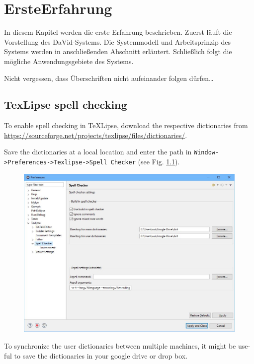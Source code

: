 \chapter{ErsteErfahrung} \label{cha:ErsteErfahrung}

In diesem Kapitel werden die erste Erfahrung beschrieben. Zuerst läuft die Vorstellung des DaVid-Systems. Die Systemmodell und Arbeitsprinzip des Systems werden in anschließenden Abschnitt erläutert. Schließlich folgt die mögliche Anwendungsgebiete des Systems.

Nicht vergessen, dass Überschriften nicht aufeinander folgen dürfen\ldots

\begin{otherlanguage}{english}
\section{TexLipse spell checking}
%
To enable spell checking in TeXLipse, download the respective dictionaries from 
\url{https://sourceforge.net/projects/texlipse/files/dictionaries/}.

Save the dictionaries at a local location and enter the path in \texttt{Window->Preferences->Tex\-lipse->Spell Checker} (see Fig. \ref{fig:dict_path}).
%
\begin{figure}[htb]
	\centering
	\includegraphics[scale=0.40]{images/Spell_Checker_preferences.jpg}
	\label{fig:dict_path}
\end{figure}

To synchronize the user dictionaries between multiple machines, it might be useful to save the dictionaries in your google drive or drop box.


\end{otherlanguage}
